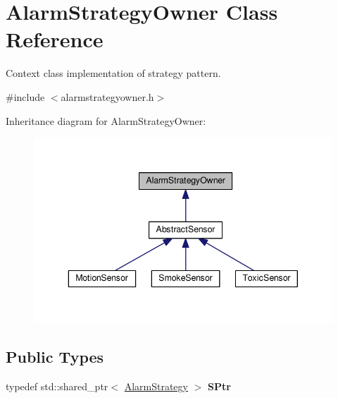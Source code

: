 \hypertarget{classAlarmStrategyOwner}{}\section{Alarm\+Strategy\+Owner Class Reference}
\label{classAlarmStrategyOwner}


Context class implementation of strategy pattern.  




{\ttfamily \#include $<$alarmstrategyowner.\+h$>$}



Inheritance diagram for Alarm\+Strategy\+Owner\+:
\nopagebreak
\begin{figure}[H]
\begin{center}
\leavevmode
\includegraphics[width=343pt]{classAlarmStrategyOwner__inherit__graph}
\end{center}
\end{figure}
\subsection*{Public Types}
\begin{DoxyCompactItemize}
\item 
typedef std\+::shared\+\_\+ptr$<$ \hyperlink{classAlarmStrategy}{Alarm\+Strategy} $>$ {\bfseries S\+Ptr}\hypertarget{classAlarmStrategyOwner_aeebd31011e2a6d14a4492315ad15c5ee}{}\label{classAlarmStrategyOwner_aeebd31011e2a6d14a4492315ad15c5ee}

\end{DoxyCompactItemize}
